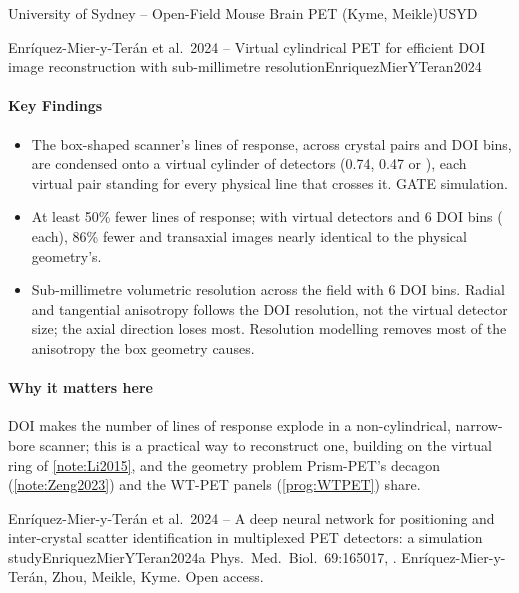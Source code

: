 \begin{programnote}{University of Sydney -- Open-Field Mouse Brain PET (Kyme, Meikle)}{USYD}
\begin{papernote}{Enríquez-Mier-y-Terán et al.\ 2024 -- Virtual cylindrical PET for efficient DOI image reconstruction with sub-millimetre resolution}{EnriquezMierYTeran2024}
\paragraph{Key Findings}
\begin{itemize}
	\item The box-shaped scanner's lines of response, across crystal pairs and
		DOI bins, are condensed onto a virtual cylinder of detectors
		(0.74, 0.47 or ), each virtual pair standing for every
		physical line that crosses it. GATE simulation.
	\item At least 50\% fewer lines of response; with  virtual
		detectors and 6 DOI bins ( each), 86\% fewer and transaxial
		images nearly identical to the physical geometry's.
	\item Sub-millimetre volumetric resolution across the field with 6 DOI
		bins. Radial and tangential anisotropy follows the DOI resolution, not
		the virtual detector size; the axial direction loses most.
		Resolution modelling removes most of the anisotropy the box geometry
		causes.
\end{itemize}

\paragraph{Why it matters here}
DOI makes the number of lines of response explode in a non-cylindrical,
narrow-bore scanner; this is a practical way to reconstruct one, building on the
virtual ring of \ref{note:Li2015}, and the
geometry problem Prism-PET's decagon (\ref{note:Zeng2023}) and the WT-PET panels
(\ref{prog:WTPET}) share.
\end{papernote}

\begin{papernote}{Enríquez-Mier-y-Terán et al.\ 2024 -- A deep neural network for positioning and inter-crystal scatter identification in multiplexed PET detectors: a simulation study}{EnriquezMierYTeran2024a}
Phys.\ Med.\ Biol.\ 69:165017, .
Enríquez-Mier-y-Terán, Zhou, Meikle, Kyme. Open access.


\end{papernote}
\end{programnote}
